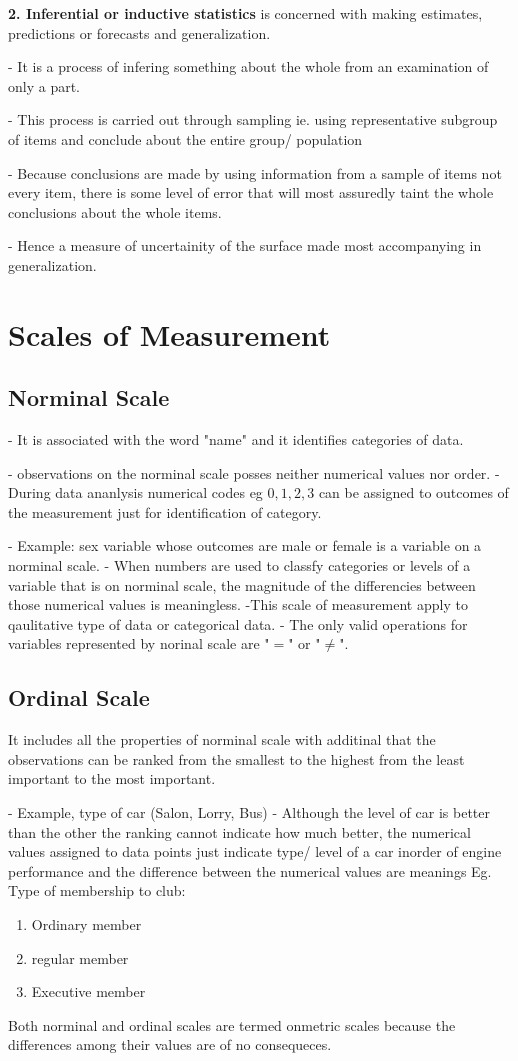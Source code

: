 \documentclass[12pt,a4paper]{article}
\begin{document}
\textbf{2. Inferential or inductive statistics} is concerned with making estimates, predictions or forecasts and generalization.

- It is  a process of infering something about the whole from an examination of only a part.

- This process is carried out through sampling ie. using representative subgroup of items and conclude about the entire group/ population

- Because conclusions are made by using information from a sample of items not every item, there is some level of error that will most assuredly taint the whole conclusions about the whole items.

- Hence a measure of uncertainity of the surface made most accompanying in generalization.

\section{Scales of Measurement}

\subsection{Norminal Scale}
- It is associated with the word "name" and it identifies categories of data.

- observations on the norminal scale posses neither numerical values nor order.
- During data ananlysis numerical codes eg $0, 1, 2, 3$ can be assigned to outcomes of the measurement just for identification of category.

- Example: sex variable whose outcomes are male or female is a variable on a norminal scale.
- When numbers are used to classfy categories or levels of a variable that is on norminal scale, the magnitude of the differencies between those numerical values is meaningless.
-This scale of measurement apply to qaulitative type of data or categorical data.
- The only valid operations for variables represented by norinal scale are "$=$" or "$\neq$".
\subsection{Ordinal Scale}
It includes all the properties of norminal scale with additinal that the observations can be ranked from the smallest to the highest from the least important to the most important.

- Example, type of car (Salon, Lorry, Bus)
- Although the level of car is better than the other the ranking cannot indicate how much better, the numerical values assigned to data points just indicate type/ level of a car inorder of engine performance and the difference between the numerical values are meanings Eg. Type of membership to club:
\begin{enumerate}
    \item Ordinary member
    \item regular member
    \item Executive member
\end{enumerate}
Both norminal and ordinal scales are termed onmetric scales because the differences among their values are of no consequeces.
\end{document}
